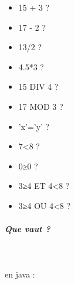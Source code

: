 \documentclass[11pt,a4paper]{article}
\begin{document}
					\begin{itemize}
				
			\item 15 + 3 ?  \textcolor{gray}{\underline{\hspace*{2em}}} 
			\item 17 - 2 ?  \textcolor{gray}{\underline{\hspace*{2em}}} 
			\item 13/2 ?  \textcolor{gray}{\underline{\hspace*{2em}}} 
			\item 4.5*3 ?  \textcolor{gray}{\underline{\hspace*{3em}}} 
			\item 15 DIV 4 ?  \textcolor{gray}{\underline{\hspace*{1em}}} 
			\item 17 MOD 3 ?  \textcolor{gray}{\underline{\hspace*{1em}}} 
			\item 'x'='y' ?  \textcolor{gray}{\underline{\hspace*{3em}}} 
			\item 7<8 ?  \textcolor{gray}{\underline{\hspace*{3em}}} 
			\item 0≥0 ?  \textcolor{gray}{\underline{\hspace*{3em}}} 
			\item 3≥4 ET 4<8 ?  \textcolor{gray}{\underline{\hspace*{3em}}} 
			\item 3≥4 OU 4<8 ?  \textcolor{gray}{\underline{\hspace*{3em}}} 
					\end{itemize}
				
			
		\subparagraph{Que vaut ?} 
		
                \textcolor{white}{.} \par
            
							  en java :
							
\end{document}
